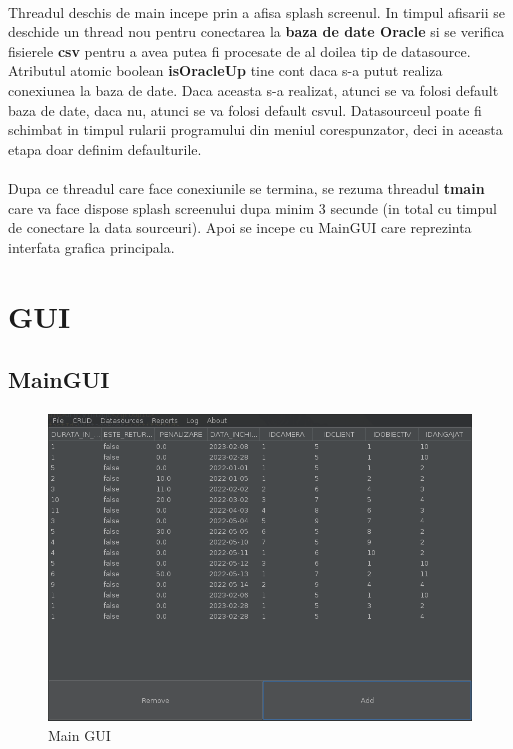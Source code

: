 \documentclass[oneside]{article}
\begin{document}
\paragraph{} Threadul deschis de main incepe prin a afisa splash screenul. In timpul afisarii se deschide un thread nou pentru conectarea la \textbf{baza de date Oracle} si se verifica fisierele \textbf{csv} pentru a avea putea fi procesate de al doilea tip de datasource. Atributul atomic boolean \textbf{isOracleUp} tine cont daca s-a putut realiza conexiunea la baza de date. Daca aceasta s-a realizat, atunci se va folosi default baza de date, daca nu, atunci se va folosi default csvul. Datasourceul poate fi schimbat in timpul rularii programului din meniul corespunzator, deci in aceasta etapa doar definim defaulturile.
\paragraph{} Dupa ce threadul care face conexiunile se termina, se rezuma threadul \textbf{tmain} care va face dispose splash screenului dupa minim 3 secunde (in total cu timpul de conectare la data sourceuri). Apoi se incepe cu MainGUI care reprezinta interfata grafica principala.

\section[GUI]{GUI}
\subsection[MainGUI]{MainGUI}
\paragraph{}
\begin{figure}[ht]
    \centering
    \noindent\includegraphics[width=\linewidth]{program.png}
    \caption{Main GUI}
    \label{fig:maingui}
\end{figure}
\end{document}
